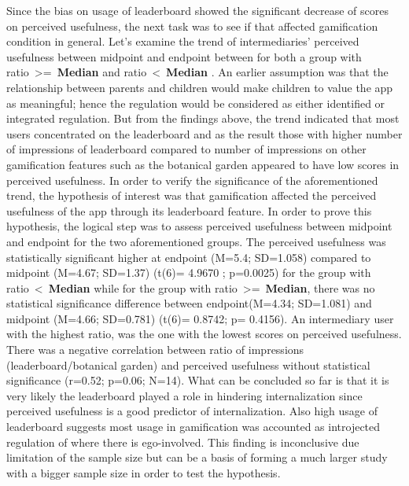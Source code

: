 Since the bias on usage of leaderboard showed the significant decrease of scores on perceived usefulness, the next task was to see if that affected gamification condition in general. Let's examine the trend of intermediaries' perceived usefulness between midpoint and endpoint between for both a group with ratio~\textgreater=~\textbf{Median} and ratio~\textless~\textbf{Median} . An earlier assumption was that the relationship between parents and children would make children to value the app as meaningful; hence the regulation would be considered as either identified or integrated regulation. But from the findings above, the trend indicated that most users concentrated on the leaderboard and as the result those with higher number of impressions of leaderboard compared to number of impressions on other gamification features such as the botanical garden appeared to have low scores in perceived usefulness. In order to verify the significance of the aforementioned trend,  the hypothesis of interest was that gamification affected the perceived usefulness of the app through its leaderboard feature. In order to prove this hypothesis, the logical step was to assess perceived usefulness between midpoint and endpoint for the two aforementioned groups. The perceived usefulness was statistically significant higher at endpoint (M=5.4; SD=1.058) compared to midpoint (M=4.67; SD=1.37) (t(6)= 4.9670 ; p=0.0025) for the group with ratio~\textless~\textbf{Median} while for the group with ratio~\textgreater=~\textbf{Median}, there was no statistical significance difference between endpoint(M=4.34; SD=1.081) and midpoint (M=4.66; SD=0.781) (t(6)= 0.8742; p= 0.4156). An intermediary user with the highest ratio, was the one with the lowest scores on perceived usefulness. There was a negative correlation between ratio of impressions (leaderboard/botanical garden) and perceived usefulness without statistical significance (r=0.52; p=0.06; N=14). What can be concluded so far is that it is very likely the leaderboard played a role in hindering internalization since perceived usefulness is a good predictor of internalization.  Also high usage of leaderboard suggests most usage in gamification was accounted as introjected regulation of where there is ego-involved. This finding is inconclusive due limitation of the sample size but can be a basis of forming a much larger study with a bigger sample size in order to test the hypothesis.

